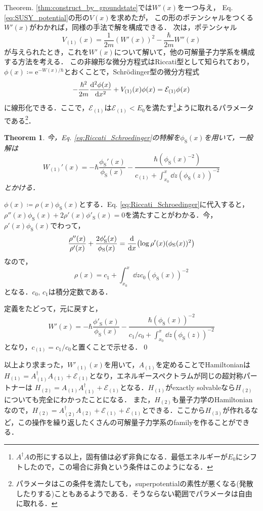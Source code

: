 \documentclass[english, dvipdfmx, a4paper]{jsarticle}
\theoremstyle{break}
\newtheorem{thm}{Theorem}
\newcommand{\e}{\mathrm{e}}
\renewcommand{\S}{\text{S}}
\begin{document}
	Theorem. \ref{thm:construct_by_groundstate}では$W'(x)$を一つ与え，
	Eq. \eqref{eq:SUSY_potential}の形の$V(x)$を求めたが，
	この形のポテンシャルをつくる$W'(x)$がわかれば，同様の手法で解を構成できる．
	次は，ポテンシャル
	\begin{equation}
		V_{(1)}(x) = \frac{1}{2m}(W'(x))^2 -\frac{\hbar}{2m}W''(x)
	\end{equation}
	が与えられたとき，これを$W'(x)$について解いて，他の可解量子力学系を構成する方法を考える．
	この非線形な微分方程式はRiccati型として知られており，
	$\phi(x) \coloneqq \e^{-W(x)/\hbar}$とおくことで，Schr\"{o}dinger型の微分方程式
	\begin{equation}
		-\frac{\hbar^2}{2m}\dv[2]{\phi(x)}{x} + V_{(1)}(x)\phi(x) = \mathcal{E}_{(1)}\phi(x)\label{eq:Riccati_Schroedinger}
	\end{equation}
	に線形化できる．ここで，$\mathcal{E}_{(1)}$は$\mathcal{E}_{(1)} < E_0$を満たす\footnote{$A^{\dag}A$の形にする以上，固有値は必ず非負になる．最低エネルギーが$E_0$にシフトしたので，この場合に非負という条件はこのようになる．}ように取れるパラメータである\footnote{パラメータはこの条件を満たしても，superpotentialの素性が悪くなる(発散したりする)こともあるようである．そうならない範囲でパラメータは自由に取れる．}．
	\begin{thm}
		今，Eq. \eqref{eq:Riccati_Schroedinger}の特解を$\phi_{\S}(x)$を用いて，一般解は
		\begin{equation}
			W_{(1)}'(x) = -\hbar \frac{\phi_{\S}'(x)}{\phi_\S(x)} - \frac{\hbar(\phi_\S(x)^{-2})}{c_{(1)} + \displaystyle\int_{x_0}^{x}\dd{z}(\phi_{\S}(z))^{-2}}
		\end{equation}
		とかける．
	\end{thm}
	$\phi(x)\coloneqq \rho(x)\phi_\S(x)$とする．Eq. \eqref{eq:Riccati_Schroedinger}に代入すると，
	$\rho''(x)\phi_\S(x) + 2\rho'(x)\phi'_\S(x) = 0$を満たすことがわかる．今，$\rho'(x)\phi_\S(x)$でわって，
	\begin{equation}
		\frac{\rho''(x)}{\rho'(x)} + \frac{2\phi_\S'(x)}{\phi_\S(x)} = \dv{}{x} \qty(\log \rho'(x)(\phi_\S(x))^2)
	\end{equation}
	なので，
	\begin{equation}
		\rho(x) = c_1 + \int_{x_0}^{x}\dd{z}c_0(\phi_\S(x))^{-2}
	\end{equation}
	となる．$c_0$, $c_1$は積分定数である．

	定義をたどって，元に戻すと，
	\begin{equation}
		W'(x) = - \hbar\frac{\phi'_\S(x)}{\phi_\S(x)} - \frac{\hbar(\phi_\S(x))^{-2}}{c_1/c_0 + \int_{x_0}^{x}\dd{z}(\phi_\S(z))^{-2}}
	\end{equation}
	となり，$c_{(1)} = c_1/c_0$と置くことで示せる．\qed


	以上より求まった，$W'_{(1)}(x)$を用いて，$A_{(1)}$を定めることでHamiltonianは$H_{(1)} = A_{(1)}^\dag A_{(1)} + \mathcal{E}_{(1)}$となり，エネルギースペクトラムが同じの超対称パートナーは
	$H_{(2)} = A_{(1)}A_{(1)}^{\dag} + \mathcal{E}_{(1)}$となる．$H_{(1)}$がexactly solvableなら$H_{(2)}$についても完全にわかったことになる．
	また，$H_{(2)}$も量子力学のHamiltonianなので，$H_{(2)} = A_{(2)}^{\dag}A_{(2)} + \mathcal{E}_{(1)} + \mathcal{E}_{(1)}$とできる．ここから$H_{(3)}$が作れるなど，この操作を繰り返したくさんの可解量子力学系のfamilyを作ることができる．
\end{document}
